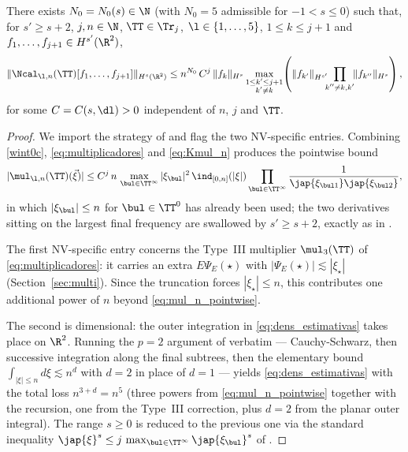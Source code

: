 \begin{lemma}\label{lem:dens_estimativas}
There exists $N_0=N_0(s)\in\N$ (with $N_0=5$ admissible for
$-1<s\le 0$) such that, for $s'\ge s+2$, $j,n\in\N$, $\TT\in\Tr_j$,
$\l\in\{1,\dots,5\}$, $1\le k\le j+1$ and
$f_1,\dots,f_{j+1}\in H^{s'}(\R^2)$,
\begin{equation}\label{eq:dens_estimativas}
\|\Ncal_{\l,n}(\TT)[f_1,\dots,f_{j+1}]\|_{H^s(\R^2)}
\le n^{N_0}\, C^j\, \|f_k\|_{H^s}
\max_{\substack{1\le k'\le j+1\\ k'\ne k}}\!\left(
\|f_{k'}\|_{H^{s'}}\!\!\!\prod_{\substack{k''\ne k,k'}}\!\!\|f_{k''}\|_{H^s}
\right),
\end{equation}
for some $C=C(s,\dl)>0$ independent of $n$, $j$ and $\TT$.
\end{lemma}

\begin{proof}
We import the strategy of \cite[Lemma~5.2]{chcora} and flag the two
NV-specific entries. Combining \eqref{wint0c},
\eqref{eq:multiplicadores} and \eqref{eq:Kmul_n} produces the
pointwise bound
\begin{equation}\label{eq:mul_n_pointwise}
|\mul_{\l,n}(\TT)(\vec\xi)|
\le C^j\, n\, \max_{\bul\in\TT^\infty}|\xi_\bul|^2\,
\ind_{[0,n]}(|\xi|)
\prod_{\bul\in\TT^\infty}\frac{1}{\jap{\xi_{\bul1}}\jap{\xi_{\bul2}}},
\end{equation}
in which $|\xi_\bul|\le n$ for $\bul\in\TT^0$ has already been used;
the two derivatives sitting on the largest final frequency are
swallowed by $s'\ge s+2$, exactly as in \cite{chcora}.

The first NV-specific entry concerns the Type~III multiplier
$\mul_3(\TT)$ of \eqref{eq:multiplicadores}: it carries an extra
$E\Psi_E(\star)$ with $|\Psi_E(\star)|\lesssim|\xi_\star|$
(Section~\ref{sec:multi}). Since the truncation forces
$|\xi_\star|\le n$, this contributes one additional power of $n$
beyond \eqref{eq:mul_n_pointwise}.

The second is dimensional: the outer integration in
\eqref{eq:dens_estimativas} takes place on $\R^2$. Running the
$p=2$ argument of \cite[Lemma~5.2]{chcora} verbatim ---
Cauchy-Schwarz, then successive integration along the final
subtrees, then the elementary bound
$\int_{|\xi|\le n}d\xi\lesssim n^d$ with $d=2$ in place of $d=1$ ---
yields \eqref{eq:dens_estimativas} with the total loss
$n^{3+d}=n^5$ (three powers from \eqref{eq:mul_n_pointwise} together
with the recursion, one from the Type~III correction, plus $d=2$
from the planar outer integral). The range $s\ge 0$ is reduced to
the previous one via the standard inequality
$\jap{\xi}^s\le j\,\max_{\bul\in\TT^\infty}\jap{\xi_\bul}^s$
of \cite[Lemma~5.2]{chcora}.
\end{proof}

